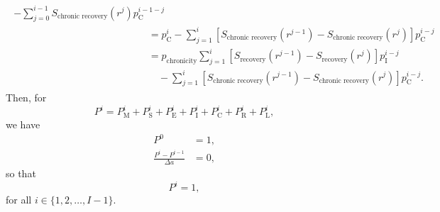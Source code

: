 \documentclass[12pt]{article}
\begin{document}
\begin{subequations}
\begin{align}
\begin{split}
    - \sum_{j = 0}^{i - 1} S_{\text{chronic recovery}}(r^j) p_{\mathrm{C}}^{i - 1 - j}
    \\
    &= p_{\mathrm{C}}^i
    - \sum_{j = 1}^i \left[S_{\text{chronic recovery}}(r^{j - 1})
      - S_{\text{chronic recovery}}(r^j)\right]
    p_{\mathrm{C}}^{i - j}
    \\
    &= p_{\text{chronicity}}
    \sum_{j = 1}^i \left[S_{\text{recovery}}(r^{j - 1})
      - S_{\text{recovery}}(r^j)\right] p_{\mathrm{I}}^{i - j}
    \\ & \quad {}
    - \sum_{j = 1}^i \left[S_{\text{chronic recovery}}(r^{j - 1})
      - S_{\text{chronic recovery}}(r^j)\right]
    p_{\mathrm{C}}^{i - j}.
  \end{split}
\end{align}
\end{subequations}
Then, for
\begin{equation}
  P^i = P_{\mathrm{M}}^i + P_{\mathrm{S}}^i + P_{\mathrm{E}}^i
  + P_{\mathrm{I}}^i + P_{\mathrm{C}}^i + P_{\mathrm{R}}^i
  + P_{\mathrm{L}}^i,
\end{equation}
we have
\begin{subequations}
  \begin{align}
    P^0 &= 1,
    \\
    \frac{P^i - P^{i - 1}}{\Delta a} &= 0,
  \end{align}
\end{subequations}
so that
\begin{equation}
  P^i = 1,
\end{equation}
for all $i \in \{1, 2, \ldots, I - 1\}$.




\end{document}
